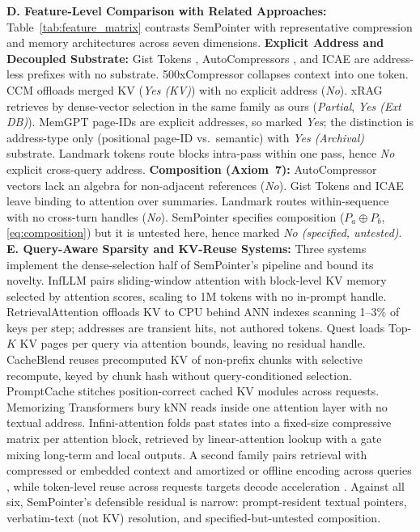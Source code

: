 \documentclass[conference]{IEEEtran}
\begin{document}
{\enlargethispage{2\baselineskip}
\noindent\textbf{D. Feature-Level Comparison with Related Approaches:}
Table~\ref{tab:feature_matrix} contrasts SemPointer with representative compression and memory architectures across seven dimensions.
\textbf{Explicit Address and Decoupled Substrate:} Gist Tokens \cite[§2]{mu2023gist}, AutoCompressors \cite[§3.1]{chevalier2023autocompressors}, and ICAE \cite[§2]{ge2024icae} are address-less prefixes with no substrate. 500xCompressor \cite[§3]{li2025500xcompressor} collapses context into one token. CCM \cite[§3.2]{kim2024ccm} offloads merged KV (\emph{Yes (KV)}) with no explicit address (\emph{No}). xRAG \cite[§2.2]{cheng2024xrag} retrieves by dense-vector selection in the same family as ours (\emph{Partial}, \emph{Yes (Ext DB)}). MemGPT \cite{packer2023memgpt} page-IDs are explicit addresses, so marked \emph{Yes}; the distinction is address-type only (positional page-ID vs.\ semantic) with \emph{Yes (Archival)} substrate. Landmark \cite[§3]{mohtashami2023landmark} tokens route blocks intra-pass within one pass, hence \emph{No} explicit cross-query address.
\textbf{Composition (Axiom~7):} AutoCompressor vectors \cite[§3.1]{chevalier2023autocompressors} lack an algebra for non-adjacent references (\emph{No}). Gist Tokens \cite{mu2023gist} and ICAE \cite{ge2024icae} leave binding to attention over summaries. Landmark \cite[§3]{mohtashami2023landmark} routes within-sequence with no cross-turn handles (\emph{No}). SemPointer specifies composition ($P_a \oplus P_b$, \eqref{eq:composition}) but it is untested here, hence marked \emph{No (specified, untested)}.
\noindent\textbf{E. Query-Aware Sparsity and KV-Reuse Systems:} Three systems implement the dense-selection half of SemPointer's pipeline and bound its novelty. InfLLM \cite{xiao2024infllm} pairs sliding-window attention with block-level KV memory selected by attention scores, scaling to 1M tokens with no in-prompt handle. RetrievalAttention \cite{liu2025retrievalattention} offloads KV to CPU behind ANN indexes scanning 1--3\% of keys per step; addresses are transient hits, not authored tokens. Quest \cite{tang2024quest} loads Top-$K$ KV pages per query via attention bounds, leaving no residual handle. CacheBlend \cite{yao2025cacheblend} reuses precomputed KV of non-prefix chunks with selective recompute, keyed by chunk hash without query-conditioned selection. PromptCache \cite{gim2024promptcache} stitches position-correct cached KV modules across requests. Memorizing Transformers \cite{wu2022memorizing} bury kNN reads inside one attention layer with no textual address. Infini-attention \cite{munkhdalai2024infiniattention} folds past states into a fixed-size compressive matrix per attention block, retrieved by linear-attention lookup with a gate mixing long-term and local outputs. A second family pairs retrieval with compressed or embedded context and amortized or offline encoding across queries \cite{xu2024recomp, rau2025cocom, tan2024lloco, gao2025uniicl, tack2024mac}, while token-level reuse across requests targets decode acceleration \cite{luo2025recycling}. Against all six, SemPointer's defensible residual is narrow: prompt-resident textual pointers, verbatim-text (not KV) resolution, and specified-but-untested composition.

}
\end{document}
